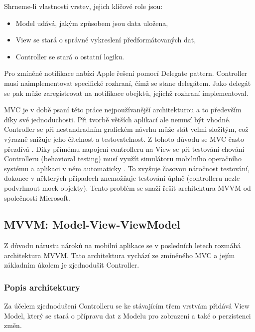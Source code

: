Shrneme-li vlastnosti vrstev, jejich klíčové role jsou:

\begin{itemize}
  \item Model udává, jakým způsobem jsou data uložena,
  \item View se stará o správné vykreslení předformátovaných dat,
  \item Controller se stará o ostatní logiku.
\end{itemize}

Pro zmíněné notifikace nabízí Apple řešení pomocí Delegate pattern.
Controller musí naimplementovat specifické rozhraní, čímž se stane delegátem.
Jako delegát se pak může zaregistrovat na notifikace obejktů, jejichž rozhraní implementoval.

MVC je v době psaní této práce nejpoužívanější architekturou a to především díky své jednoduchosti.
Při tvorbě větších aplikací ale nemusí být vhodné.
Controller se při nestandradním grafickém návrhu může stát velmi složitým, což výrazně snižuje jeho čitelnost a testovatelnost.
Z tohoto důvodu se MVC často přezdívá .
Díky přímému napojení controlleru na View se při testování chování Controlleru (behavioral testing) musí využít simulátoru mobilního operačního systému a aplikaci v něm automaticky .
To zvyšuje časovou náročnost testování, dokonce v některých případech znemožňuje testování úplně (controlleru nezle podvrhnout mock objekty).
Tento problém se snaží řešit architektura MVVM od společnosti Microsoft.

\subsection{MVVM: Model-View-ViewModel}\label{analyza-mvvm}

Z důvodu nárustu nároků na mobilní aplikace se v posledních letech rozmáhá architektura MVVM.
Tato architektura vychází ze zmíněného MVC a jejím základním úkolem je zjednodušit Controller.

\subsubsection{Popis architektury} \label{architektura-mvvm-popis}

Za účelem zjednodušení Controlleru se ke stávajícím třem vrstvám přidává View Model, který se stará o přípravu dat z Modelu pro zobrazení a také o perzistenci změn.

